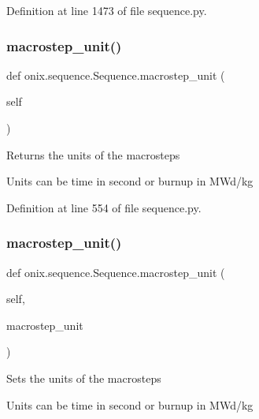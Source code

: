 Definition at line 1473 of file sequence.\+py.

\mbox{\label{classonix_1_1sequence_1_1Sequence_ad30b07af38fcb327ddb27bfa3447a7a3}} 
\subsubsection{\texorpdfstring{macrostep\+\_\+unit()}{macrostep\_unit()}\hspace{0.1cm}{\footnotesize\ttfamily [1/2]}}
{\footnotesize\ttfamily def onix.\+sequence.\+Sequence.\+macrostep\+\_\+unit (\begin{DoxyParamCaption}\item[{}]{self }\end{DoxyParamCaption})}

\begin{DoxyVerb}Returns the units of the macrosteps

Units can be time in second or burnup in MWd/kg
\end{DoxyVerb}
 

Definition at line 554 of file sequence.\+py.

\mbox{\label{classonix_1_1sequence_1_1Sequence_adaa3417c90ead3932aa9da69962dd3ac}} 
\subsubsection{\texorpdfstring{macrostep\+\_\+unit()}{macrostep\_unit()}\hspace{0.1cm}{\footnotesize\ttfamily [2/2]}}
{\footnotesize\ttfamily def onix.\+sequence.\+Sequence.\+macrostep\+\_\+unit (\begin{DoxyParamCaption}\item[{}]{self,  }\item[{}]{macrostep\+\_\+unit }\end{DoxyParamCaption})}

\begin{DoxyVerb}Sets the units of the macrosteps

Units can be time in second or burnup in MWd/kg\end{DoxyVerb}
 


